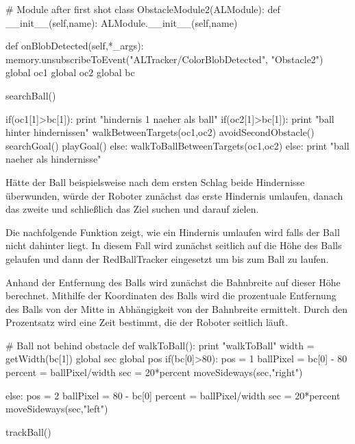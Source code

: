 \documentclass{scrartcl}
\begin{document}
\begin{python}
# Module after first shot
class ObstacleModule2(ALModule):
    def __init__(self,name):
        ALModule.__init__(self,name)

    def onBlobDetected(self,*_args):
        memory.unsubscribeToEvent("ALTracker/ColorBlobDetected",
        	"Obstacle2")
        global oc1
        global oc2
        global bc

        searchBall()
        
        if(oc1[1]>bc[1]):
            print "hindernis 1 naeher als ball"
            if(oc2[1]>bc[1]):
                print "ball hinter hindernissen"
                walkBetweenTargets(oc1,oc2)
                avoidSecondObstacle()
                searchGoal()
                playGoal()
            else:
                walkToBallBetweenTargets(oc1,oc2)
        else:
            print "ball naeher als hindernisse"
            

\end{python} 

Hätte der Ball beispielsweise nach dem ersten Schlag beide Hindernisse überwunden, würde der Roboter zunächst das erste Hindernis umlaufen, danach das zweite und schließlich das Ziel suchen und darauf zielen.

Die nachfolgende Funktion zeigt, wie ein Hindernis umlaufen wird falls der Ball nicht dahinter liegt. In diesem Fall wird zunächst seitlich auf die Höhe des Balls gelaufen und dann der RedBallTracker eingesetzt um bis zum Ball zu laufen.

Anhand der Entfernung des Balls wird zunächst die Bahnbreite auf dieser Höhe berechnet. Mithilfe der Koordinaten des Balls wird die prozentuale Entfernung des Balls von der Mitte in Abhängigkeit von der Bahnbreite ermittelt. Durch den Prozentsatz wird eine Zeit bestimmt, die der Roboter seitlich läuft.


\begin{python}
# Ball not behind obstacle
def walkToBall():
    print "walkToBall"
    width = getWidth(bc[1])
    global sec
    global pos
    if(bc[0]>80):
        pos = 1
        ballPixel = bc[0] - 80
        percent = ballPixel/width
        sec = 20*percent
        moveSideways(sec,"right")

    else:
        pos = 2
        ballPixel = 80 - bc[0]
        percent = ballPixel/width
        sec = 20*percent
        moveSideways(sec,"left")

    trackBall()
\end{python}
\end{document}
